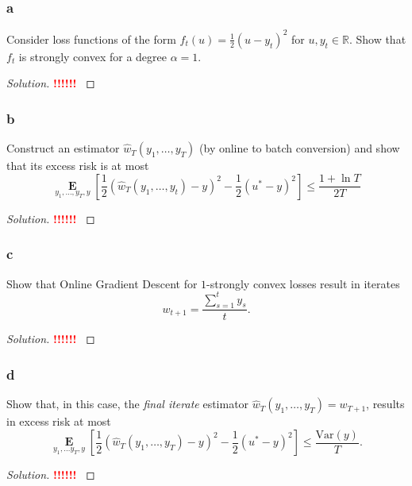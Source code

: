 \documentclass[10pt, a4paper, twoside]{amsart}
\theoremstyle{plain}
\newcommand{\R}{\ensuremath{\mathbb{R}}}
\newcommand{\Ev}{\operatorname*{\ensuremath{\mathbf{E}}}} %
\newenvironment{solution}
               {\let\oldqedsymbol=\qedsymbol
                \renewcommand{\qedsymbol}{$\blacktriangleleft$}
                \begin{proof}[Solution]}
               {\end{proof}
                \renewcommand{\qedsymbol}{\oldqedsymbol}}
\newcommand{\TODO}{\textcolor{red}{\textbf{!!!!!! }}}
\begin{document}
\subsubsection*{a} Consider loss functions of the form $f_t (u) = \frac{1}{2}(u - y_t)^2$ for $u, y_t \in \R$. Show that $f_t$ is strongly convex for a degree $\alpha =1$.
\begin{solution}
  \TODO
\end{solution}
\subsubsection*{b} Construct an estimator $\hat{w}_T(y_1, \ldots , y_T)$ (by online to batch conversion) and show that its excess risk is at most
\begin{equation*}
  \Ev_{y_1, \ldots , y_T,y} \left[ \frac{1}{2}(\hat{w}_T(y_1, \ldots , y_t) - y)^2 - \frac{1}{2}(u^* - y)^2 \right] \leq \frac{1+ \ln T}{2T}
\end{equation*}
\begin{solution}
  \TODO
\end{solution}
\subsubsection*{c} Show that Online Gradient Descent for $1$-strongly convex losses result in iterates
\begin{equation*}
  w_{t+1} = \frac{\sum_{s=1}^ty_s}{t}.
\end{equation*}
\begin{solution}
  \TODO
\end{solution}
\subsubsection*{d} Show that, in this case, the \textit{final iterate} estimator $\hat{w}_T(y_1,\ldots , y_T) = w_{T+1}$, results in excess risk at most
\begin{equation*}
  \Ev_{y_1, \ldots y_T,y}\left[\frac{1}{2} (\hat{w}_T (y_1, \ldots , y_T) - y)^2 - \frac{1}{2} (u^* - y)^2 \right] \leq \frac{\text{Var}(y)}{T}.
\end{equation*}
\begin{solution}
  \TODO
\end{solution}
\end{document}
